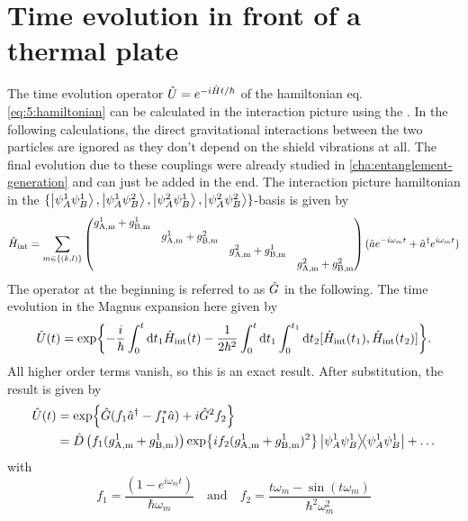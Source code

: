 \section{Time evolution in front of a thermal plate}\label{apx:thermal-shield-time-evolution}
The time evolution operator $\hat{U}=e^{-i\hat{H}t/\hbar}$ of the hamiltonian eq. \eqref{eq:5:hamiltonian} can be calculated in the interaction picture using the  \cite{Blanes_2009}.
In the following calculations, the direct gravitational interactions between the two particles are ignored as they don't depend on the shield vibrations at all. The final evolution due to these couplings were already studied in \cref{cha:entanglement-generation} and can just be added in the end. 
The interaction picture hamiltonian in the $\{\ket{\psi^1_A\psi^1_B},\ket{\psi^1_A\psi^2_B},\ket{\psi^2_A\psi^1_B},\ket{\psi^2_A\psi^2_B}\}$-basis is given by
\begin{equation}
  \hat{H}_\mathrm{int} = \sum_{m\in\{(k,l)\}} \begin{pmatrix}
    g^1_\mathrm{A,m} + g^1_\mathrm{B,m}& & & \\
    & g^1_\mathrm{A,m} + g^2_\mathrm{B,m}& & \\
    & & g^2_\mathrm{A,m} + g^1_\mathrm{B,m}& \\
    & & & g^2_\mathrm{A,m} + g^2_\mathrm{B,m}
  \end{pmatrix}(\hat{a}e^{-i\omega_m t}+\hat{a}^\dagger e^{i\omega_m t})
\end{equation}
The operator at the beginning is referred to as $\hat{G}$ in the following.
The time evolution in the Magnus expansion here given by \cite{Blanes_2009}
\begin{equation}
  \hat{U}(t) = \exp{-\frac{i}{\hbar}\int_{0}^{t}\dd t_1 \hat{H}_\mathrm{int}(t)-\frac{1}{2\hbar^2}\int_{0}^{t}\dd t_1 \int_{0}^{t_1}\dd t_2 [\hat{H}_\mathrm{int}(t_1),\hat{H}_\mathrm{int}(t_2)]} .
\end{equation}
All higher order terms vanish, so this is an exact result.
After substitution, the result is given by
\begin{align}
  \hat{U}(t) &= \exp{\hat{G}(f_1\hat{a}^\dagger - f_1^*\hat{a}) + i \hat{G}^2 f_2} \\ 
  &= \hat{D}\left(f_1(g^1_\mathrm{A,m} + g^1_\mathrm{B,m})\right) \exp{i f_2 (g^1_\mathrm{A,m} + g^1_\mathrm{B,m})^2} \ketbra{\psi^1_A\psi^1_B} + \dots
\end{align}
with
\begin{equation}
  f_1 = \frac{(1-e^{i\omega_m t})}{\hbar \omega_m}
  \quad \text{and} \quad
  f_2 = \frac{t\omega_m - \sin(t \omega_m)}{\hbar^2 \omega_m^2}
\end{equation}
